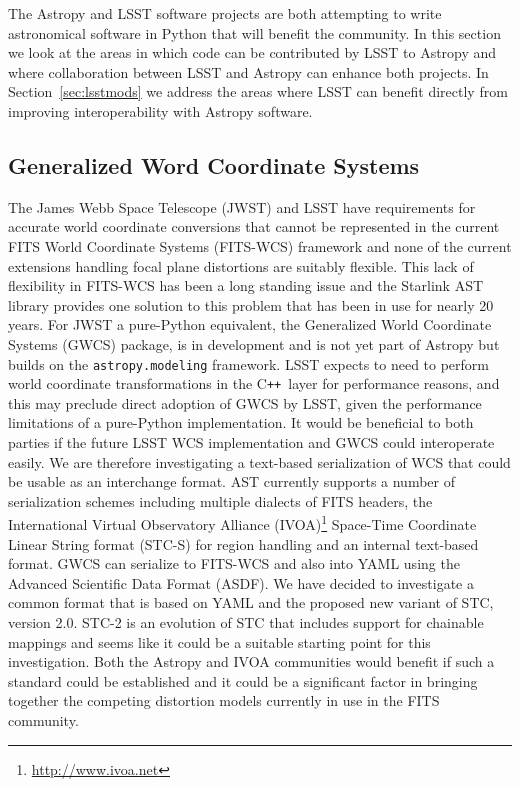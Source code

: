 \documentclass[]{spie}  %
\newcommand{\CPP}{C\texttt{++}\xspace}  %
\begin{document}
The Astropy and LSST software projects are both attempting to write astronomical software in Python that will benefit the community.
In this section we look at the areas in which code can be contributed by LSST to Astropy and where collaboration between LSST and Astropy can enhance both projects.
In Section~\ref{sec:lsstmods} we address the areas where LSST can benefit directly from improving interoperability with Astropy software.

\subsection{Generalized Word Coordinate Systems}

The James Webb Space Telescope (JWST)\cite{2006SSRv..123..485G} and LSST have requirements for accurate world coordinate conversions that cannot be represented in the current FITS World Coordinate Systems (FITS-WCS) framework\cite{2013ASPC..475...49H,2002A&A...395.1077C,2015A&C....12..133T} and none of the current extensions handling focal plane distortions\cite{2012SPIE.8451E..1MS,2012tpv} are suitably flexible.
This lack of flexibility in FITS-WCS has been a long standing issue and the Starlink AST library\cite{Berry201633} provides one solution to this problem that has been in use for nearly 20 years.
For JWST a pure-Python equivalent, the Generalized World Coordinate Systems (GWCS) package, is in development\cite{2016_P028_adassxxv} and is not yet part of Astropy but builds on the \texttt{astropy.modeling} framework.
LSST expects to need to perform world coordinate transformations in the \CPP\ layer for performance reasons, and this may preclude direct adoption of GWCS by LSST, given the performance limitations of a pure-Python implementation.
It would be beneficial to both parties if the future LSST WCS implementation and GWCS could interoperate easily.
We are therefore investigating a text-based serialization of WCS that could be usable as an interchange format.
AST currently supports a number of serialization schemes including multiple dialects of FITS headers, the International Virtual Observatory Alliance (IVOA)\footnote{\url{http://www.ivoa.net}} Space-Time Coordinate Linear String format (STC-S)\cite{2007ivoa.spec.1030R} for region handling\cite{2010ASPC..434..213B} and an internal text-based format.
GWCS can serialize to FITS-WCS and also into YAML\cite{2009yaml} using the Advanced Scientific Data Format (ASDF)\cite{2015A&C....12..240G}.
We have decided to investigate a common format that is based on YAML and the proposed new variant of STC, version 2.0.
STC-2\cite{2015ivoaSTC2} is an evolution of STC that includes support for chainable mappings and seems like it could be a suitable starting point for this investigation.
Both the Astropy and IVOA communities would benefit if such a standard could be established and it could be a significant factor in bringing together the competing distortion models currently in use in the FITS community.
\end{document}
